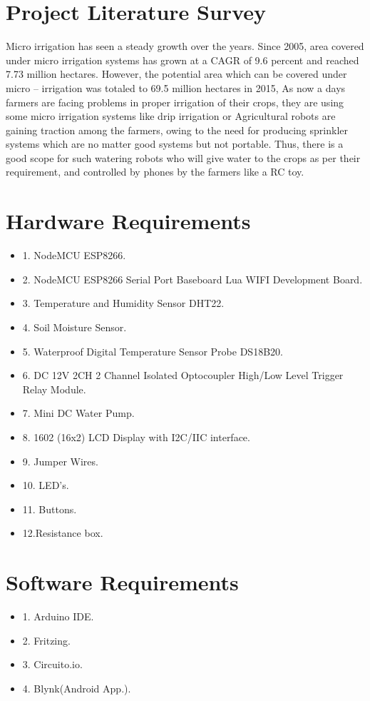\documentclass[dvips,12pt]{article}
\begin{document}
\section*{Project Literature Survey}
Micro irrigation has seen a steady growth over the years. Since 2005, area covered under micro irrigation
systems has grown at a CAGR of 9.6 percent and reached 7.73 million hectares. However, the potential area which
can be covered under micro – irrigation was totaled to 69.5 million hectares in 2015, As now a days farmers
are facing problems in proper irrigation of their crops, they are using some micro irrigation systems like drip
irrigation or Agricultural robots are gaining traction among the farmers, owing to the need for producing
sprinkler systems which are no matter good systems but not portable. Thus, there is a good scope for such
watering robots who will give water to the crops as per their requirement, and controlled by phones by the
farmers like a RC toy.

\section*{Hardware Requirements}
\begin{itemize}
 \item 1. NodeMCU ESP8266.
 \item 2. NodeMCU ESP8266 Serial Port Baseboard Lua WIFI Development Board.
\item 3. Temperature and Humidity Sensor DHT22.
\item 4. Soil Moisture Sensor.
\item 5. Waterproof Digital Temperature Sensor Probe DS18B20.
\item 6. DC 12V 2CH 2 Channel Isolated Optocoupler High/Low Level Trigger Relay Module.
\item 7. Mini DC Water Pump.
\item 8. 1602 (16x2) LCD Display with I2C/IIC interface.
\item 9. Jumper Wires.
\item 10. LED’s.
\item 11. Buttons.
\item 12.Resistance box.
\end{itemize}
\section*{Software Requirements}
\begin{itemize}
\item 1. Arduino IDE.
\item 2. Fritzing.
\item 3. Circuito.io.
\item 4. Blynk(Android App.).
\end{itemize}
\end{document}
